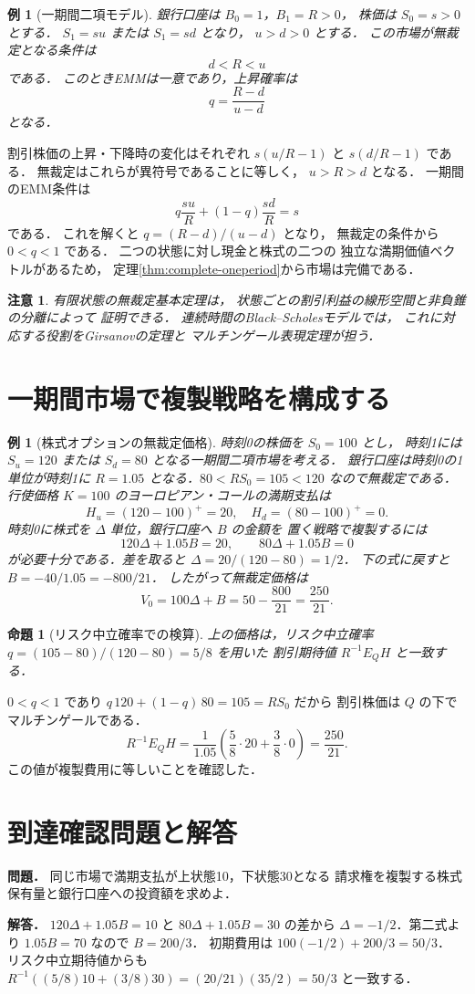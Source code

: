 \documentclass[a5paper,10pt,onecolumn]{jsarticle}
\makeatletter
\theoremstyle{mathnotetheorem}
\newtheorem{proposition}[theorem]{命題}
\newtheorem{example}[theorem]{例}
\newtheorem{remark}[theorem]{注意}
\renewcommand{\proofname}{証明}
\renewenvironment{proof}[1][\proofname]{%
  \par\pushQED{\qed}\normalfont\topsep4\p@\@plus2\p@\relax
  \trivlist\item[\hskip\labelsep\bfseries #1]\ignorespaces
}{\popQED\endtrivlist\@endpefalse}
\makeatother
\begin{document}
\begin{example}[一期間二項モデル]
銀行口座は $B_0=1$，$B_1=R>0$，
株価は $S_0=s>0$ とする．
$S_1=su$ または $S_1=sd$ となり，
$u>d>0$ とする．
この市場が無裁定となる条件は
\[
 d<R<u
\]
である．
このときEMMは一意であり，上昇確率は
\[
 q=\frac{R-d}{u-d}
\]
となる．
\end{example}
\begin{proof}
割引株価の上昇・下降時の変化はそれぞれ
$s(u/R-1)$ と $s(d/R-1)$ である．
無裁定はこれらが異符号であることに等しく，
$u>R>d$ となる．
一期間のEMM条件は
\[
 q\frac{su}{R}+(1-q)\frac{sd}{R}=s
\]
である．
これを解くと $q=(R-d)/(u-d)$ となり，
無裁定の条件から $0<q<1$ である．
二つの状態に対し現金と株式の二つの
独立な満期価値ベクトルがあるため，
定理\ref{thm:complete-oneperiod}から市場は完備である．
\end{proof}

\begin{remark}
有限状態の無裁定基本定理は，
状態ごとの割引利益の線形空間と非負錐の分離によって
証明できる．
連続時間のBlack--Scholesモデルでは，
これに対応する役割をGirsanovの定理と
マルチンゲール表現定理が担う．
\end{remark}

\section{一期間市場で複製戦略を構成する}
\begin{example}[株式オプションの無裁定価格]
時刻0の株価を $S_0=100$ とし，
時刻1には $S_u=120$ または $S_d=80$
となる一期間二項市場を考える．
銀行口座は時刻0の1単位が時刻1に $R=1.05$
となる．$80<RS_0=105<120$ なので無裁定である．
行使価格 $K=100$ のヨーロピアン・コールの満期支払は
\[
 H_u=(120-100)^+=20,\quad H_d=(80-100)^+=0.
\]
時刻0に株式を $\Delta$ 単位，銀行口座へ $B$ の金額を
置く戦略で複製するには
\[
 120\Delta+1.05 B=20,\qquad
 80\Delta+1.05 B=0
\]
が必要十分である．差を取ると
$\Delta=20/(120-80)=1/2$．
下の式に戻すと $B=-40/1.05=-800/21$．
したがって無裁定価格は
\[
 V_0=100\Delta+B
 =50-\frac{800}{21}=\frac{250}{21}.
\]
\end{example}
\begin{proposition}[リスク中立確率での検算]
上の価格は，リスク中立確率
$q=(105-80)/(120-80)=5/8$ を用いた
割引期待値 $R^{-1}E_QH$ と一致する．
\end{proposition}
\begin{proof}
$0<q<1$ であり
$q\,120+(1-q)\,80=105=RS_0$ だから
割引株価は $Q$ の下でマルチンゲールである．
\[
 R^{-1}E_QH
 =\frac1{1.05}\left(\frac58\cdot20
                  +\frac38\cdot0\right)
 =\frac{250}{21}.
\]
この値が複製費用に等しいことを確認した．
\end{proof}
\section*{到達確認問題と解答}
\noindent\textbf{問題．}
同じ市場で満期支払が上状態10，下状態30となる
請求権を複製する株式保有量と銀行口座への投資額を求めよ．

\medskip\noindent\textbf{解答．}
$120\Delta+1.05B=10$ と
$80\Delta+1.05B=30$ の差から
$\Delta=-1/2$．第二式より
$1.05B=70$ なので $B=200/3$．
初期費用は $100(-1/2)+200/3=50/3$．
リスク中立期待値からも
$R^{-1}((5/8)10+(3/8)30)
 =(20/21)(35/2)=50/3$ と一致する．
\end{document}
